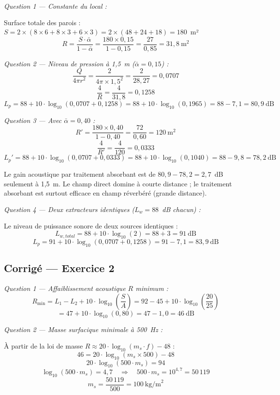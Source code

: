 \textit{Question 1 — Constante du local :}

Surface totale des parois : $S = 2 \times (8 \times 6 + 8 \times 3 + 6 \times 3) = 2 \times (48 + 24 + 18) = 180$~m²
\[
  R = \frac{S \cdot \bar{\alpha}}{1 - \bar{\alpha}} = \frac{180 \times 0{,}15}{1 - 0{,}15} = \frac{27}{0{,}85} = \boxed{31{,}8~\text{m}^2}
\]

\textit{Question 2 — Niveau de pression à 1,5~m ($\bar{\alpha} = 0{,}15$) :}
\[
  \frac{Q}{4\pi r^2} = \frac{2}{4\pi \times 1{,}5^2} = \frac{2}{28{,}27} = 0{,}0707
\]
\[
  \frac{4}{R} = \frac{4}{31{,}8} = 0{,}1258
\]
\[
  L_p = 88 + 10 \cdot \log_{10}(0{,}0707 + 0{,}1258) = 88 + 10 \cdot \log_{10}(0{,}1965) = 88 - 7{,}1 = \boxed{80{,}9~\text{dB}}
\]

\textit{Question 3 — Avec $\bar{\alpha} = 0{,}40$ :}
\[
  R' = \frac{180 \times 0{,}40}{1 - 0{,}40} = \frac{72}{0{,}60} = 120~\text{m}^2
\]
\[
  \frac{4}{R'} = \frac{4}{120} = 0{,}0333
\]
\[
  L_p' = 88 + 10 \cdot \log_{10}(0{,}0707 + 0{,}0333) = 88 + 10 \cdot \log_{10}(0{,}1040) = 88 - 9{,}8 = \boxed{78{,}2~\text{dB}}
\]

\begin{attention}
Le gain acoustique par traitement absorbant est de $80{,}9 - 78{,}2 = 2{,}7$~dB seulement à 1,5~m. Le champ direct domine à courte distance ; le traitement absorbant est surtout efficace en champ réverbéré (grande distance).
\end{attention}

\textit{Question 4 — Deux extracteurs identiques ($L_w = 88$~dB chacun) :}

Le niveau de puissance sonore de deux sources identiques :
\[
  L_{w,total} = 88 + 10 \cdot \log_{10}(2) = 88 + 3 = 91~\text{dB}
\]
\[
  L_p = 91 + 10 \cdot \log_{10}(0{,}0707 + 0{,}1258) = 91 - 7{,}1 = \boxed{83{,}9~\text{dB}}
\]

\subsection*{Corrigé — Exercice 2}

\textit{Question 1 — Affaiblissement acoustique $R$ minimum :}
\[
  R_{\min} = L_1 - L_2 + 10 \cdot \log_{10}\!\left(\frac{S}{A}\right) = 92 - 45 + 10 \cdot \log_{10}\!\left(\frac{20}{25}\right)
\]
\[
  = 47 + 10 \cdot \log_{10}(0{,}80) = 47 - 1{,}0 = \boxed{46~\text{dB}}
\]

\textit{Question 2 — Masse surfacique minimale à 500~Hz :}

À partir de la loi de masse $R \approx 20 \cdot \log_{10}(m_s \cdot f) - 48$ :
\[
  46 = 20 \cdot \log_{10}(m_s \times 500) - 48
\]
\[
  20 \cdot \log_{10}(500 \cdot m_s) = 94
\]
\[
  \log_{10}(500 \cdot m_s) = 4{,}7 \quad \Rightarrow \quad 500 \cdot m_s = 10^{4{,}7} = 50\,119
\]
\[
  m_s = \frac{50\,119}{500} = \boxed{100~\text{kg/m}^2}
\]

